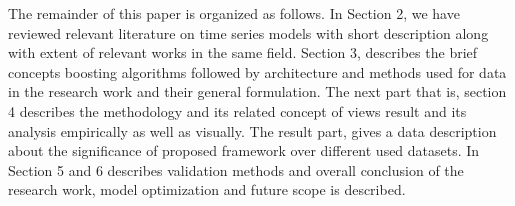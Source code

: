 The remainder of this paper is organized as follows. In Section 2, we have reviewed relevant literature on time series models with short description along with extent of relevant works in the same field. Section 3, describes the brief concepts boosting algorithms followed by architecture and methods used for data in the research work and their general formulation. The next part that is, section 4 describes the methodology and its related concept of views result and its analysis empirically as well as visually. The result part, gives a data description about the significance of proposed framework over different used datasets. In Section 5 and 6 describes validation methods and overall conclusion of the research work, model optimization and future scope is described. 